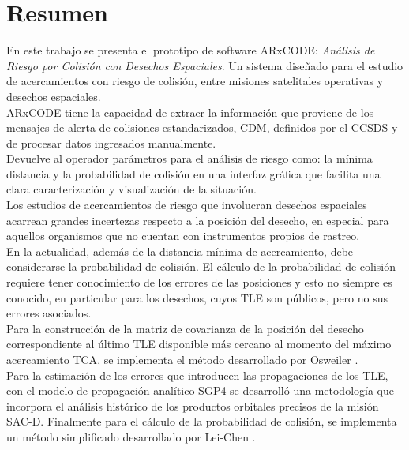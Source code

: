 \chapter*{Resumen}
\label{chap:resumen}
En este trabajo se presenta el prototipo de software ARxCODE: {\it{An\'alisis de Riesgo por Colisi\'on con Desechos Espaciales}}. Un sistema dise\~nado para el estudio de acercamientos con riesgo de colisi\'on, entre misiones satelitales operativas y desechos espaciales.\\

ARxCODE tiene la capacidad de extraer la informaci\'on que proviene de los mensajes de alerta de colisiones estandarizados, \ac{CDM}, definidos por el \ac{CCSDS} y de procesar datos ingresados manualmente.\\
Devuelve al operador par\'ametros para el an\'alisis de riesgo como: la m\'inima distancia y la probabilidad de colisi\'on en una interfaz gr\'afica que facilita una clara caracterizaci\'on y visualizaci\'on de la situaci\'on.\\

Los estudios de acercamientos de riesgo que involucran desechos espaciales acarrean grandes incertezas respecto a la posici\'on del desecho, en especial para aquellos organismos que no cuentan con instrumentos propios de rastreo.\\
En la actualidad, adem\'as de la distancia m\'inima de acercamiento, debe considerarse la probabilidad de colisi\'on. El c\'alculo de la probabilidad de colisi\'on requiere tener conocimiento de los errores de las posiciones y esto no siempre es conocido, en particular para los desechos, cuyos \ac{TLE} son p\'ublicos, pero no sus errores asociados.\\

Para la construcci\'on de la matriz de covarianza de la posici\'on del desecho correspondiente al \'ultimo TLE disponible m\'as cercano al momento del m\'aximo acercamiento \ac{TCA}, se implementa el m\'etodo desarrollado por Osweiler \citep{osweiler}.\\
Para la estimaci\'on de los errores que introducen las propagaciones de los TLE, con el modelo de propagaci\'on anal\'itico \ac{SGP4} se desarroll\'o una metodolog\'ia que incorpora el análisis hist\'orico de los productos orbitales precisos de la misi\'on SAC-D.
Finalmente para el c\'alculo de la probabilidad de colisi\'on, se implementa un m\'etodo simplificado desarrollado por Lei-Chen \citep{leichen}.\\

